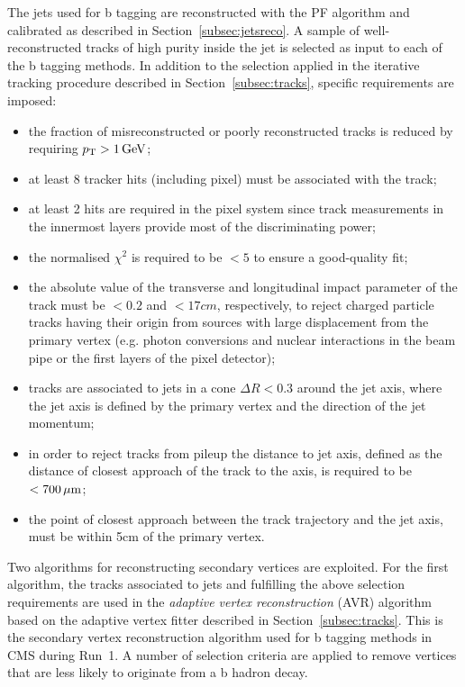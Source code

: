 The jets used for b tagging are reconstructed with the PF algorithm and calibrated as described in Section~\ref{subsec:jetsreco}. A sample of well-reconstructed tracks of high purity inside the jet is selected as input to each of the b tagging methods. In addition to the selection applied in the iterative tracking procedure described in Section~\ref{subsec:tracks}, specific requirements are imposed:

\begin{itemize}
\item the fraction of misreconstructed or poorly reconstructed tracks is reduced by requiring $p_{\mathrm{T}} >1\,\text{Ge\hspace{-.08em}V}$;
\item at least 8 tracker hits (including pixel) must be associated with the track;
\item at least 2 hits are required in the pixel system since track measurements in the innermost layers provide most of the discriminating power;
\item the normalised $\chi^2$ is required to be $< 5$ to ensure a good-quality fit;
\item the absolute value of the transverse and longitudinal impact parameter of the track must be $< 0.2$ and $< 17\unit{cm}$, respectively, to reject charged particle tracks having their origin from sources with large displacement from the primary vertex (e.g. photon conversions and nuclear interactions in the beam pipe or the first layers of the pixel detector);
\item tracks are associated to jets in a cone $\Delta R < 0.3$ around the jet axis, where the jet axis is defined by the primary vertex and the direction of the jet momentum;
\item in order to reject tracks from pileup the distance to jet axis, defined as the distance of closest approach of the track to the axis, is required to be $< 700\,\mu\text{m}$;
\item the point of closest approach between the track trajectory and the jet axis, must be within 5\unit{cm} of the primary vertex.
\end{itemize}

Two algorithms for reconstructing secondary vertices are exploited. For the first algorithm, the tracks associated to jets and fulfilling the above selection requirements are used in the \textit{adaptive vertex reconstruction} (AVR) algorithm~\cite{Waltenberger:1166320} based on the adaptive vertex fitter described in Section~\ref{subsec:tracks}. This is the secondary vertex reconstruction algorithm used for b tagging methods in CMS during Run~1. A number of selection criteria are applied to remove vertices that are less likely to originate from a b hadron decay. 

